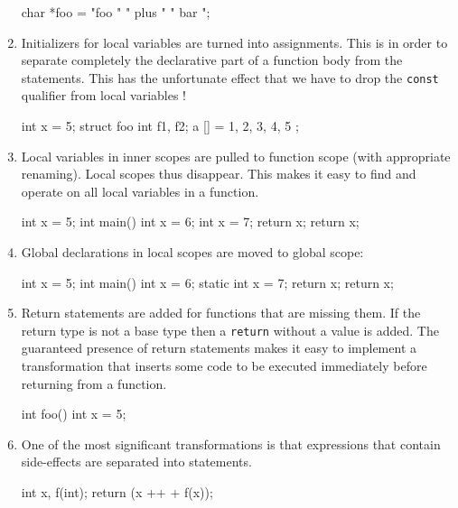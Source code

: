 \documentclass{article}
\def\t#1{{\tt #1}}
\begin{document}
\begin{enumerate}
\begin{cilcode}[global]
char *foo = "foo " " plus " " bar ";
\end{cilcode}

\item Initializers for local variables are turned into assignments. This is in
order to separate completely the declarative part of a function body from the
statements. This has the unfortunate effect that we have to drop the \t{const}
qualifier from local variables !

\begin{cilcode}[local]
  int x = 5; 
  struct foo { int f1, f2; } a [] = {1, 2, 3, 4, 5 };
\end{cilcode}

\item Local variables in inner scopes are pulled to function scope (with
appropriate renaming). Local scopes thus disappear. This makes it easy to find
and operate on all local variables in a function.

\begin{cilcode}[global]
  int x = 5; 
  int main() {
    int x = 6;
    { 
      int x = 7;
      return x;
    }
    return x;
  } 
\end{cilcode}

\item Global declarations in local scopes are moved to global scope:
\begin{cilcode}[global]
  int x = 5; 
  int main() {
    int x = 6;
    { 
      static int x = 7;
      return x;
    }
    return x;
  } 
\end{cilcode}

\item Return statements are added for functions that are missing them. If the
return type is not a base type then a \t{return} without a value is added.
The guaranteed presence of return statements makes it easy to implement a
transformation that inserts some code to be executed immediately before
returning from a function.
\begin{cilcode}[global]
  int foo() {
    int x = 5;
  } 
\end{cilcode}

\item One of the most significant transformations is that expressions that
contain side-effects are separated into statements. 

\begin{cilcode}[local]
   int x, f(int);
   return (x ++ + f(x));
\end{cilcode}


\end{enumerate}
\end{document}
